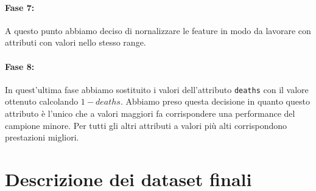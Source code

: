 \documentclass[a4paper,12pt,openany,oneside]{book}
\begin{document}
\paragraph{Fase 7:} A questo punto abbiamo deciso di nornalizzare le feature in modo da lavorare con attributi con valori nello stesso range.
\paragraph{Fase 8:} In quest'ultima fase abbiamo sostituito i valori dell'attributo \verb|deaths| con il valore ottenuto calcolando $1 - deaths $. Abbiamo preso questa decisione in quanto questo attributo è l'unico che a valori maggiori fa corrispondere una performance del campione minore. Per tutti gli altri attributi a valori più alti corrispondono prestazioni migliori.
\section{Descrizione dei dataset finali}
\end{document}
